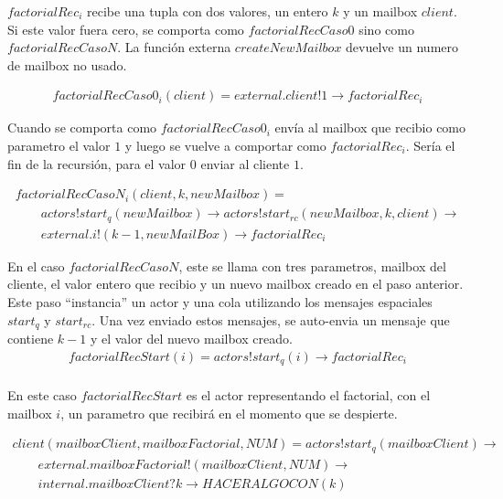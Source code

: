 \documentclass[fleqn]{article}
\begin{document}
$factorialRec_i$ recibe una tupla con dos valores, un entero $k$ y un mailbox $client$. Si este valor fuera cero, se comporta como $factorialRecCaso0$ sino como $factorialRecCasoN$.
La función externa $createNewMailbox$ devuelve un numero de mailbox no usado. 

\begin{gather*}
factorialRecCaso0_i(client) = external.client!1 \rightarrow factorialRec_i 
\end{gather*}

Cuando se comporta como $factorialRecCaso0_i$ envía al mailbox que recibio como parametro el valor $1$ y luego se vuelve a comportar como $factorialRec_i$. Sería el fin de la recursión, para el valor $0$ enviar al cliente $1$.

\begin{gather*}
factorialRecCasoN_i(client,k, newMailbox) = \\
  \qquad actors!start_q(newMailbox) \rightarrow actors!start_{rc}(newMailbox, k, client) \rightarrow \\
  \qquad external.i!(k - 1, newMailBox) \rightarrow factorialRec_i
\end{gather*}

En el caso $factorialRecCasoN$, este se llama con tres parametros, mailbox del cliente, el valor entero que recibio y un nuevo mailbox creado en el paso anterior. Este paso ``instancia'' un actor y una cola utilizando los mensajes espaciales $start_q$ y $start_{rc}$. Una vez enviado estos mensajes, se auto-envia un mensaje que contiene $k - 1$ y el valor del nuevo mailbox creado.\\

\begin{gather*}
factorialRecStart(i) = actors!start_q(i) \rightarrow factorialRec_i \\
\end{gather*}

En este caso $factorialRecStart$ es el actor representando el factorial, con el mailbox $i$, un parametro que recibirá en el momento que se despierte.

\begin{gather*}
client(mailboxClient, mailboxFactorial, NUM) =  actors!start_q(mailboxClient) \rightarrow  \\
\qquad  external.mailboxFactorial!(mailboxClient,NUM) \rightarrow \\
\qquad internal.mailboxClient?k \rightarrow HACERALGOCON(k) 
\end{gather*}
\end{document}
